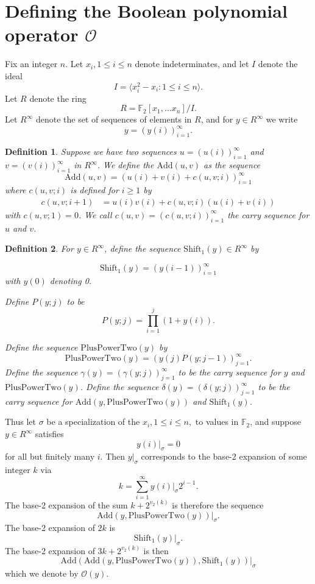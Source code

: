 \documentclass[11pt, oneside]{article}   	%
\newtheorem{definition}{Definition}
\begin{document}
\section{Defining the Boolean polynomial operator $\mathscr{O}$}


Fix an integer $n$. Let $x_i, 1 \leq i \leq n$ denote indeterminates, and let $I$ denote the ideal 
\[
I = \langle x_i^{2}-x_i \colon 1 \leq i \leq n \rangle. 
\]
Let $R$ denote the ring 
\[
R= \mathbb{F}_2[x_1, \ldots x_n]/ I.
\]
Let $R^\infty$ denote the set of sequences of elements in $R$, and for $y \in R^\infty$ we write  
\[
y = (y(i))_{i=1}^\infty.
\]


\begin{definition} 
Suppose we have two sequences $u=(u(i))_{i=1}^\infty$ and $v=(v(i))_{i=1}^\infty$ in $R^\infty$. We define the  
$\mathrm{Add}(u,v)$ as the sequence
\[
\mathrm{Add}(u,v)= (u(i)+ v(i) + c(u,v;i))_{i=1}^{\infty}
\]
where  $c(u,v;i)$ is defined for $i \geq 1$ by
\begin{align*}
c(u,v;i+1) &= u(i) v(i)+ c(u,v;i)(u(i)+v(i))  
\end{align*}
with $c(u,v;1)=0$. We call $c(u,v) =(c(u,v;i))_{i=1}^{\infty}$ the \emph{carry sequence} for $u$ and $v$. 
\end{definition} 

\begin{definition} 
For $y \in R^\infty$, define the sequence $\mathrm{Shift}_1(y) \in R^\infty$ by 

\[
\mathrm{Shift}_1(y) = (y(i-1))_{i=1}^\infty
\]
with $y(0)$ denoting 0. 

Define $P(y;j)$ to be 
\[
P(y;j) =  \prod_{i=1}^{j}(1+y(i)).
\]

Define the sequence $\mathrm{PlusPowerTwo}(y)$ by 
\[
\mathrm{PlusPowerTwo}(y)= (y(j) P(y;j-1))_{j=1}^\infty.
\]
Define the sequence $\gamma(y) = (\gamma(y; j))_{j=1}^\infty$ to be the carry sequence for $y$ and $\mathrm{PlusPowerTwo}(y)$. 
Define the sequence $\delta(y) = (\delta(y; j))_{j=1}^\infty$ to be the carry sequence for $\mathrm{Add}(y,\mathrm{PlusPowerTwo}(y))$ and $\mathrm{Shift}_1(y) $.  
\end{definition} 

Thus let $\sigma$ be a specialization of the $x_i, 1 \leq i \leq n,$ to values in $\mathbb{F}_2$, and suppose  $y \in R^\infty$ satisfies 
\[
y(i)\big |_\sigma =0
\]
for all but finitely many $i$. Then $y\big|_\sigma$ corresponds to the base-2 expansion of some integer $k$ via 
\[
k = \sum_{i=1}^\infty y(i) \big |_\sigma 2^{i-1}. 
\] 
 The base-2 expansion of the sum $k+2^{v_2(k)}$ is therefore the sequence 
\[
\mathrm{Add}(y,\mathrm{PlusPowerTwo}(y))\big|_\sigma.
\]
The base-2 expansion of $2k$ is 
\[
\mathrm{Shift}_1(y)\big|_\sigma. 
\]
The base-2 expansion of $3k+2^{v_2(k)}$ is then 
\[
\mathrm{Add}(\mathrm{Add}(y,\mathrm{PlusPowerTwo}(y)), \mathrm{Shift}_1(y))\big|_\sigma
\]
which we denote by $\mathscr{O}(y)$. 
\end{document}
